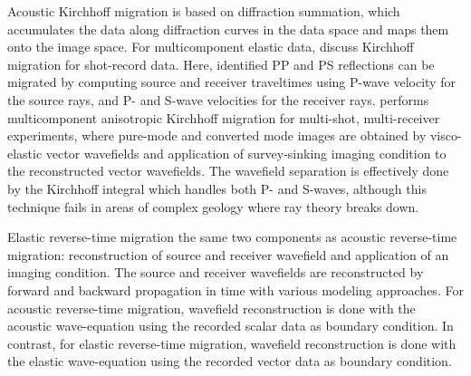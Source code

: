 Acoustic Kirchhoff migration is based on diffraction summation, which
accumulates the data along diffraction curves in the data space and
maps them onto the image space. For multicomponent elastic data,
\cite{kuo:1223} discuss Kirchhoff migration for shot-record
data. Here, identified PP and PS reflections can be migrated by
computing source and receiver traveltimes using P-wave velocity for
the source rays, and P- and S-wave velocities for the receiver
rays. \cite{hokstad:861} performs multicomponent anisotropic
Kirchhoff migration for multi-shot, multi-receiver experiments, where
pure-mode and converted mode images are obtained by   visco-elastic vector wavefields and application of
 survey-sinking imaging condition to the reconstructed vector
wavefields. The wavefield separation is effectively done by the
Kirchhoff integral which handles both P- and S-waves, although this
technique fails in areas of complex geology where ray theory breaks
down.

Elastic reverse-time migration   the same two
components as acoustic reverse-time migration: reconstruction of
source and receiver wavefield and application of an imaging condition.
The source and receiver wavefields are reconstructed by forward and
backward propagation in time with various modeling approaches. For
acoustic reverse-time migration, wavefield reconstruction is done with
the acoustic wave-equation using the recorded scalar data as boundary
condition.  In contrast, for elastic reverse-time migration, wavefield
reconstruction is done with the elastic wave-equation using the
recorded vector data as boundary condition.

